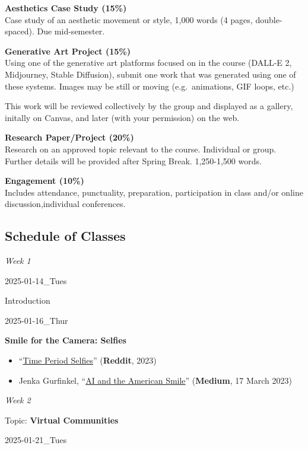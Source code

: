 \documentclass[
  letterpaper,
  DIV=11,
  numbers=noendperiod]{scrartcl}
\providecommand{\tightlist}{%
  \setlength{\itemsep}{0pt}\setlength{\parskip}{0pt}}
\begin{document}
\textbf{Aesthetics Case Study (15\%)}\\
Case study of an aesthetic movement or style, 1,000 words (4 pages,
double-spaced). Due mid-semester.

\textbf{Generative Art Project (15\%)}\\
Using one of the generative art platforms focused on in the course
(DALL-E 2, Midjourney, Stable Diffusion), submit one work that was
generated using one of these systems. Images may be still or moving
(e.g.~animations, GIF loops, etc.)

This work will be reviewed collectively by the group and displayed as a
gallery, initally on Canvas, and later (with your permission) on the
web.

\textbf{Research Paper/Project (20\%)}\\
Research on an approved topic relevant to the course. Individual or
group. Further details will be provided after Spring Break. 1,250-1,500
words.

\textbf{Engagement (10\%)}\\
Includes attendance, punctuality, preparation, participation in class
and/or online discussion,individual conferences.

\subsection{Schedule of Classes}\label{schedule-of-classes}

\emph{Week 1}

2025-01-14\_Tues

Introduction

2025-01-16\_Thur

\textbf{Smile for the Camera: Selfies}

\begin{itemize}
\tightlist
\item
  ``\href{https://www.reddit.com/r/midjourney/comments/11vuvdk/time_period_selfies_time_traveler_shows_soldiers/?rdt=64935}{Time
  Period Selfies}'' (\textbf{Reddit}, 2023)
\item
  Jenka Gurfinkel,
  ``\href{https://medium.com/@socialcreature/ai-and-the-american-smile-76d23a0fbfaf}{AI
  and the American Smile}'' (\textbf{Medium}, 17 March 2023)
\end{itemize}

\emph{Week 2}

Topic: \textbf{Virtual Communities}

2025-01-21\_Tues
\end{document}
